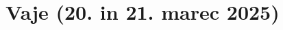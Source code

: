 \documentclass[11pt,a4paper]{exam}
\renewcommand{\{}{\lbrace}
\renewcommand{\}}{\rbrace}
\begin{document}




\section*{Vaje (20. in 21. marec 2025)}
\end{document}
